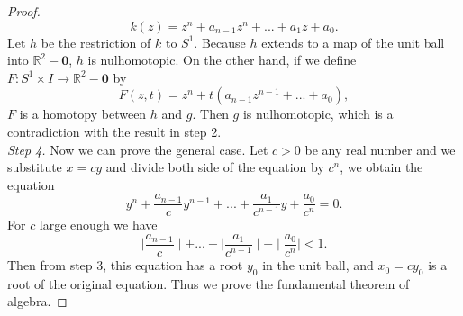 \documentclass[psamsfonts]{amsart}
\theoremstyle{definition}
\theoremstyle{remark}
\numberwithin{equation}{section}
\begin{document}
\begin{proof}
		\begin{equation}
			k(z) = z^n + a_{n-1}z^n + ... +a_1z + a_0.
		\end{equation}
		Let $h$ be the restriction of $k$ to $S^1$. Because $h$ extends to a map of the unit ball into $\mathbb{R}^2-\textbf{0}$, $h$ is nulhomotopic.
		On the other hand, if we define $F: S^1 \times I \to \mathbb{R}^2 - \textbf{0}$ by
		\begin{equation}
			F(z,t)=z^n+t(a_{n-1}z^{n-1}+...+a_0),
		\end{equation}
		$F$ is a homotopy between $h$ and $g$. Then $g$ is nulhomotopic, which is a contradiction with the result in step 2.\\
		\textit{Step 4.} Now we can prove the general case. Let $c>0$ be any real number and we substitute $x=cy$ and divide both side of the equation by $c^n$, we obtain the equation
		\begin{equation}
			y^n + \frac{a_{n-1}}{c} y^{n-1} + ... + \frac{a_1}{c^{n-1}} y + \frac{a_0}{c^n} = 0.
		\end{equation}
		For $c$ large enough we have
		\begin{equation}
			\mid \frac{a_{n-1}}{c} \mid + ... + \mid \frac{a_1}{c^{n-1}} \mid + \mid \frac{a_0}{c^n} \mid < 1.
		\end{equation}
		Then from step 3, this equation has a root $y_0$ in the unit ball, and $x_0=cy_0$ is a root of the original equation. Thus we prove the fundamental theorem of algebra.				 
	\end{proof}
\end{document}
